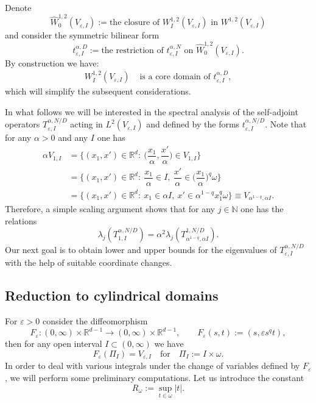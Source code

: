 \documentclass[11pt,oneside,reqno,a4paper]{amsart}
\newcommand{\N}{\mathbb{N}}
\newcommand{\R}{\mathbb{R}}
\newcommand{\eps}{\varepsilon}
\theoremstyle{definition}
\begin{document}
Denote
\[
\widehat{W}_0^{1,2}(V_{\eps,I}):=\text{the closure of }W^{1,2}_I(V_{\eps,I})\text{ in }W^{1,2}(V_{\eps,I})
\]
and consider the symmetric bilinear form
\[
t^{\alpha,D}_{\eps, I}:=\text{the restriction of  $t^{\alpha,N}_{\eps, I}$ on $\widehat{W}_0^{1,2}(V_{\eps,I})$.}
\]
By construction we have:
\begin{equation}
\begin{aligned}
	W^{1,2}_I(V_{\eps,I})&\text{ is a core domain of }t^{\alpha,D}_{\eps,I},
\end{aligned}
 \label{eq-core}
\end{equation}
which will simplify the subsequent considerations.



In what follows we will be interested in the spectral analysis of the self-adjoint operators $T^{\alpha,N/D}_{\eps,I}$
acting in $L^2(V_{\eps,I})$ and defined by the forms $t^{\alpha,N/D}_{\eps,I}$. Note that for any $\alpha>0$ and any $I$ one has
\begin{align*}
		\alpha V_{1,I}&=\Big\{ (x_1,x')\in\R^d:\ \big(\dfrac{x_1}{\alpha},\dfrac{x'}{\alpha}\big)\in V_{1,I}\Big\}\\
		&=\Big\{ (x_1,x')\in\R^d:\ \dfrac{x_1}{\alpha}\in I,\ \dfrac{x'}{\alpha}\in \big(\dfrac{x_1}{\alpha}\big)^q \omega\Big\}\\
		&=\Big\{ (x_1,x')\in\R^d:\ x_1\in \alpha I,\ x'\in \alpha^{1-q}x_1^q \omega\Big\}\equiv V_{\alpha^{1-q},\alpha I}.
\end{align*}
Therefore, a simple scaling argument shows that for any $j\in\N$ one has the relations
\begin{equation}
	\label{lscal}
\lambda_j(T^{\alpha,N/D}_{1,I})=\alpha^2 \lambda_j(T^{1,N/D}_{\alpha^{1-q},\alpha I}).
\end{equation}
Our next goal is to obtain lower and upper bounds for the eigenvalues of $T^{\alpha,N/D}_{\eps, I}$
with the help of suitable coordinate changes.

\subsection{Reduction to cylindrical domains}\label{ss-cyl}
For $\eps>0$ consider the diffeomorphism
\[
F_\eps:(0,\infty)\times\R^{d-1}\to(0,\infty)\times\R^{d-1},\qquad F_\eps(s,t):=(s,\eps s^qt),
\]
then for any open interval $I\subset(0,\infty)$ we have	
\[
F_\eps(\Pi_I)=V_{\eps,I} \quad \text{for}\quad
\Pi_I:=I\times\omega.
\]
In order to deal with various integrals under the change of variables defined by $F_\eps$,
we will perform some preliminary computations. Let us introduce the constant
\[
R_\omega:=\sup_{t\in\omega}|t|.
\]
\end{document}
